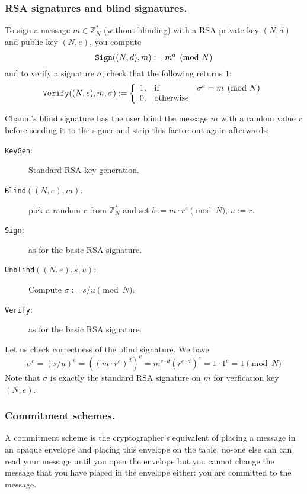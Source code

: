 \documentclass{llncs}
\newcommand{\alg}[1]{\textup{\texttt{#1}}}
\begin{document}
\subsubsection{RSA signatures and blind signatures.}
To sign a message $m \in \mathbb Z^*_N$ (without blinding) with a RSA private
key $(N, d)$ and public key $(N, e)$, you compute
\[
\alg{Sign}((N, d), m) := m^d \pmod{N}
\]
and to verify a signature $\sigma$, check that the following returns $1$:
\[
\alg{Verify}((N, e), m, \sigma) :=
\left\{ \begin{array}{lll}
1, & \textrm{if} & \sigma^e = m \pmod{N} \\
0, & \textrm{otherwise} & \\
\end{array} \right.
\]

Chaum's blind signature has the user blind the message $m$ with a random value
$r$ before sending it to the signer and strip this factor out again afterwards:

\begin{description}
\item[\alg{KeyGen}:] Standard RSA key generation.
\item[\alg{Blind}$((N, e), m)$:] pick a random $r$ from $\mathbb Z^*_N$ and set
$b := m \cdot r^e \pmod{N}$, $u := r$.
\item[\alg{Sign}:] as for the basic RSA signature.
\item[\alg{Unblind}$((N, e), s, u)$:] Compute $\sigma := s/u \pmod{N}$.
\item[\alg{Verify}:] as for the basic RSA signature.
\end{description}

Let us check correctness of the blind signature. We have
\[
\sigma^e = (s/u)^e = ((m \cdot r^e)^d)^e = m^{e \cdot d} (r^{e \cdot d})^e =
1 \cdot 1^e = 1 \pmod{N}
\]
Note that $\sigma$ is exactly the standard RSA signature on $m$ for verfication
key $(N, e)$.

\subsubsection{Commitment schemes.}
A commitment scheme is the cryptographer's equivalent of placing a message in an
opaque envelope and placing this envelope on the table: no-one else can can read
your message until you open the envelope but you cannot change the message that
you have placed in the envelope either: you are committed to the message.
\end{document}

